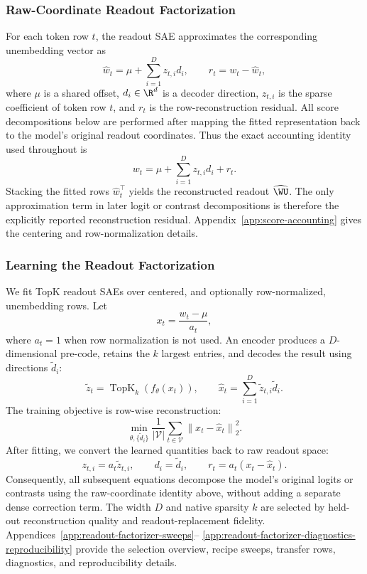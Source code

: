\subsubsection{Raw-Coordinate Readout Factorization}

For each token row \(t\), the readout SAE approximates the corresponding
unembedding vector as
\[
    \widehat{w}_t
    =
    \mu+\sum_{i=1}^{D}z_{t,i}d_i,
    \qquad
    r_t
    =
    w_t-\widehat{w}_t,
\]
where \(\mu\) is a shared offset, \(d_i\in\R^d\) is a decoder direction,
\(z_{t,i}\) is the sparse coefficient of token row \(t\), and \(r_t\) is the
row-reconstruction residual. All score decompositions below are performed after
mapping the fitted representation back to the model's original readout
coordinates. Thus the exact accounting identity used throughout is
\[
    w_t
    =
    \mu+\sum_{i=1}^{D}z_{t,i}d_i+r_t .
\]
Stacking the fitted rows \(\widehat{w}_t^\top\) yields the reconstructed readout
\(\widehat{\WU}\). The only approximation term in later logit or contrast
decompositions is therefore the explicitly reported reconstruction residual.
Appendix~\ref{app:score-accounting} gives the centering and row-normalization
details.

\subsubsection{Learning the Readout Factorization}

We fit TopK readout SAEs \citep{makhzani2013ksparse,gao2024scaling} over
centered, and optionally row-normalized, unembedding rows. Let
\[
    x_t
    =
    \frac{w_t-\mu}{a_t},
\]
where \(a_t=1\) when row normalization is not used. An encoder produces a
\(D\)-dimensional pre-code, retains the \(k\) largest entries, and decodes the
result using directions \(\widetilde d_i\):
\[
    \widetilde z_t
    =
    \operatorname{TopK}_k(f_\theta(x_t)),
    \qquad
    \widehat{x}_t
    =
    \sum_{i=1}^{D}\widetilde z_{t,i}\widetilde d_i .
\]
The training objective is row-wise reconstruction:
\[
    \min_{\theta,\{\widetilde d_i\}}
    \frac{1}{|\mathcal{V}|}
    \sum_{t\in\mathcal{V}}
    \left\|x_t-\widehat{x}_t\right\|_2^2 .
\]
After fitting, we convert the learned quantities back to raw readout space:
\[
    z_{t,i}=a_t\widetilde z_{t,i},
    \qquad
    d_i=\widetilde d_i,
    \qquad
    r_t=a_t(x_t-\widehat{x}_t).
\]
Consequently, all subsequent equations decompose the model's original logits or
contrasts using the raw-coordinate identity above, without adding a separate
dense correction term. The width \(D\) and native sparsity \(k\) are selected by
held-out reconstruction quality and readout-replacement fidelity.
Appendices~\ref{app:readout-factorizer-sweeps}--%
\ref{app:readout-factorizer-diagnostics-reproducibility} provide the selection
overview, recipe sweeps, transfer rows, diagnostics, and reproducibility details.

